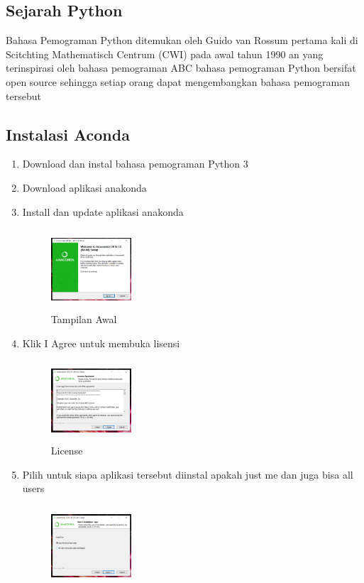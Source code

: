 \subsection{Sejarah Python}
Bahasa Pemograman Python ditemukan oleh Guido van Rossum pertama kali di Scitchting Mathematisch Centrum (CWI) pada awal tahun 1990 an yang terinspirasi oleh bahasa pemograman ABC bahasa pemograman Python bersifat open source sehingga setiap orang dapat mengembangkan bahasa pemograman tersebut
\subsection{Instalasi Aconda}
\begin{enumerate}
\item Download dan instal bahasa pemograman Python 3
\item Download aplikasi anakonda
\item Install dan update aplikasi anakonda
 \begin{figure}[!htbp]
        \centering
        \includegraphics[width=3cm,height=3cm]{figures/jonviter/1.png}
        \caption{Tampilan Awal}
        \label{awal}
        \end{figure}
    \item Klik I Agree untuk membuka lisensi
     \begin{figure}[!htbp]
        \centering
        \includegraphics[width=3cm,height=3cm]{figures/jonviter/2.png}
        \caption{License}
        \label{awal}
        \end{figure}
    \item  Pilih untuk siapa aplikasi tersebut diinstal apakah just me dan juga bisa all users
     \begin{figure}[!htbp]
        \centering
        \includegraphics[width=3cm,height=3cm]{figures/jonviter/3.png}

\end{figure}
\end{enumerate}
